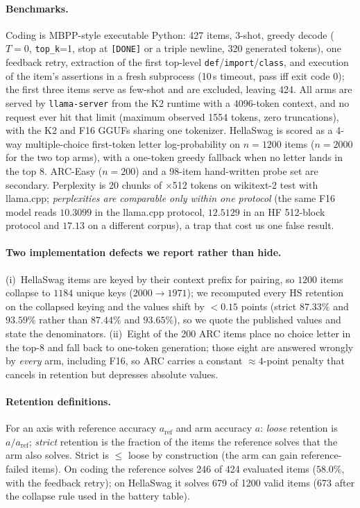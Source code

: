 \documentclass[11pt,a4paper]{article}
\begin{document}
\paragraph{Benchmarks.} Coding is MBPP-style executable Python: 427 items, 3-shot, greedy decode
($T=0$, \texttt{top\_k}=1, stop at \texttt{[DONE]} or a triple newline, 320 generated tokens), one
feedback retry, extraction of the first top-level \texttt{def}/\texttt{import}/\texttt{class}, and
execution of the item's assertions in a fresh subprocess (10\,s timeout, pass iff exit code 0);
the first three items serve as few-shot and are excluded, leaving 424. All arms are served by
\texttt{llama-server} from the K2 runtime with a $4096$-token context, and no request ever hit that
limit (maximum observed 1554 tokens, zero truncations), with the K2 and F16 GGUFs sharing one
tokenizer. HellaSwag is scored as a 4-way multiple-choice first-token letter log-probability on
$n=1200$ items ($n=2000$ for the two top arms), with a one-token greedy fallback when no letter
lands in the top 8. ARC-Easy ($n=200$) and a 98-item hand-written probe set are secondary.
Perplexity is 20 chunks of $\times$512 tokens on wikitext-2 test with llama.cpp;
\emph{perplexities are comparable only within one protocol} (the same F16 model reads $10.3099$ in
the llama.cpp protocol, $12.5129$ in an HF 512-block protocol and $17.13$ on a different corpus),
a trap that cost us one false result.

\paragraph{Two implementation defects we report rather than hide.} (i)~HellaSwag items are keyed
by their context prefix for pairing, so $1200$ items collapse to $1184$ unique keys ($2000\to1971$);
we recomputed every HS retention on the collapsed keying and the values shift by $<0.15$ points
(strict $87.33\%$ and $93.59\%$ rather than $87.44\%$ and $93.65\%$), so we quote the published
values and state the denominators. (ii)~Eight of the 200 ARC items place no choice letter in the
top-8 and fall back to one-token generation; those eight are answered wrongly by \emph{every} arm,
including F16, so ARC carries a constant $\approx4$-point penalty that cancels in retention but
depresses absolute values.

\paragraph{Retention definitions.}
\label{sec:normalisation}
For an axis with reference accuracy $a_{\mathrm{ref}}$ and arm accuracy $a$:
\emph{loose} retention is $a/a_{\mathrm{ref}}$; \emph{strict} retention is the fraction of the
items the reference solves that the arm also solves. Strict is $\le$ loose by construction
(the arm can gain reference-failed items). On coding the reference solves 246 of 424 evaluated
items ($58.0\%$, with the feedback retry); on HellaSwag it solves 679 of 1200 valid items (673 after the collapse rule used in the battery table).
\end{document}
